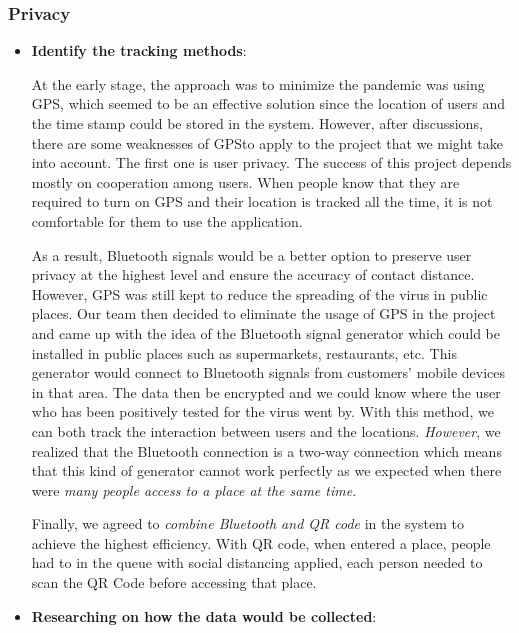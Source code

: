     \subsubsection{Privacy}
      \begin{itemize}
        \item \textbf{Identify the tracking methods}:
          \par At the early stage, the approach was to minimize the pandemic was using GPS, which seemed to be an effective solution since the location of users and the time stamp could be stored in the system. However, after discussions, there are some weaknesses of GPSto apply to the project that we might take into account. The first one is user privacy. The success of this project depends mostly on cooperation among users. When people know that they are required to turn on GPS and their location is tracked all the time, it is not comfortable for them to use the application.
          \par As a result, Bluetooth signals would be a better option to preserve user privacy at the highest level and ensure the accuracy of contact distance. However, GPS was still kept to reduce the spreading of the virus in public places. Our team then decided to eliminate the usage of GPS in the project and came up with the idea of the Bluetooth signal generator which could be installed in public places such as supermarkets, restaurants, etc. This generator would connect to Bluetooth signals from customers’ mobile devices in that area. The data then be encrypted and we could know where the user who has been positively tested for the virus went by. With this method, we can both track the interaction between users and the locations. \textit{However}, we realized that the Bluetooth connection is a two-way connection which means that this kind of generator cannot work perfectly as we expected when there were \textit{many people access to a place at the same time}.
          \par Finally, we agreed to \textit{combine Bluetooth and QR code} in the system to achieve the highest efficiency. With QR code, when entered a place, people had to in the queue with social distancing applied, each person needed to scan the QR Code before accessing that place.
        \item \textbf{Researching on how the data would be collected}:

\end{itemize}
